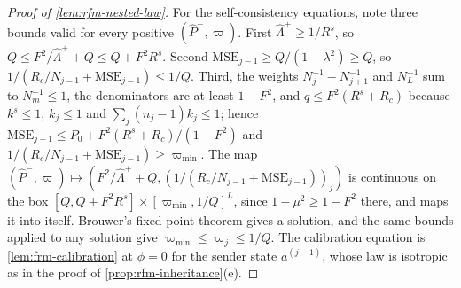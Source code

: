 \begin{proof}[Proof of \cref{lem:rfm-nested-law}]
For the self-consistency equations, note three bounds valid for every positive $(\hat P^-,\varpi)$. First $\hat\Lambda^+\ge1/R^s$, so $Q\le F^2/\hat\Lambda^++Q\le Q+F^2R^s$. Second $\mathrm{MSE}_{j-1}\ge Q/(1-\lambda^2)\ge Q$, so $1/(R_c/N_{j-1}+\mathrm{MSE}_{j-1})\le1/Q$. Third, the weights $N_j^{-1}-N_{j+1}^{-1}$ and $N_L^{-1}$ sum to $N_m^{-1}\le1$, the denominators are at least $1-F^2$, and $q\le F^2(R^s+R_c)$ because $k^s\le1$, $k_j\le1$ and $\sum_j(n_j-1)k_j\le1$; hence $\mathrm{MSE}_{j-1}\le P_0+F^2(R^s+R_c)/(1-F^2)$ and $1/(R_c/N_{j-1}+\mathrm{MSE}_{j-1})\ge\varpi_{\min}$. The map $(\hat P^-,\varpi)\mapsto(F^2/\hat\Lambda^++Q,(1/(R_c/N_{j-1}+\mathrm{MSE}_{j-1}))_j)$ is continuous on the box $[Q,Q+F^2R^s]\times[\varpi_{\min},1/Q]^L$, since $1-\mu^2\ge1-F^2$ there, and maps it into itself. Brouwer's fixed-point theorem gives a solution, and the same bounds applied to any solution give $\varpi_{\min}\le\varpi_j\le1/Q$. The calibration equation is \cref{lem:frm-calibration} at $\phi=0$ for the sender state $a^{(j-1)}$, whose law is isotropic as in the proof of \cref{prop:rfm-inheritance}(e).
\end{proof}

